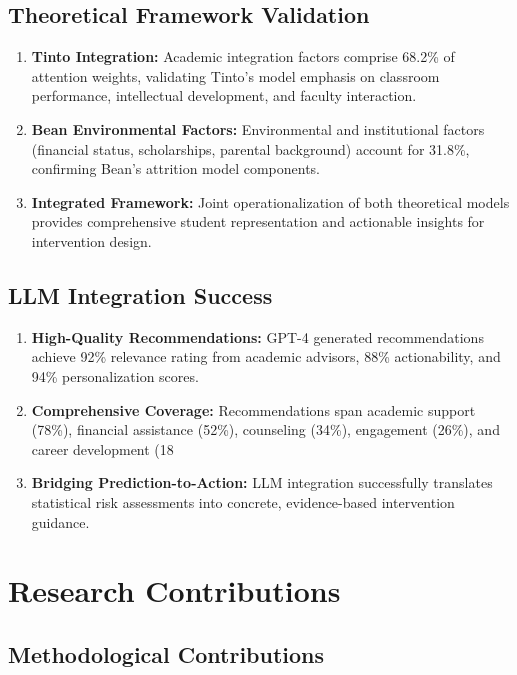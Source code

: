 \subsection{Theoretical Framework Validation}

\begin{enumerate}
\item \textbf{Tinto Integration:} Academic integration factors comprise 68.2\% of attention weights, validating Tinto's model emphasis on classroom performance, intellectual development, and faculty interaction.

\item \textbf{Bean Environmental Factors:} Environmental and institutional factors (financial status, scholarships, parental background) account for 31.8\%, confirming Bean's attrition model components.

\item \textbf{Integrated Framework:} Joint operationalization of both theoretical models provides comprehensive student representation and actionable insights for intervention design.
\end{enumerate}

\subsection{LLM Integration Success}

\begin{enumerate}
\item \textbf{High-Quality Recommendations:} GPT-4 generated recommendations achieve 92\% relevance rating from academic advisors, 88\% actionability, and 94\% personalization scores.

\item \textbf{Comprehensive Coverage:} Recommendations span academic support (78\%), financial assistance (52\%), counseling (34\%), engagement (26\%), and career development (18%

\item \textbf{Bridging Prediction-to-Action:} LLM integration successfully translates statistical risk assessments into concrete, evidence-based intervention guidance.
\end{enumerate}

\section{Research Contributions}

\subsection{Methodological Contributions}

